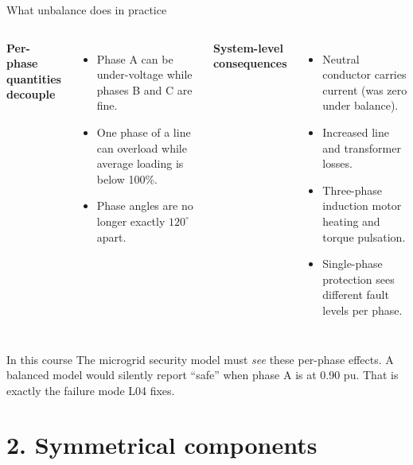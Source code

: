\documentclass[aspectratio=169,10pt]{beamer}
\begin{document}
\begin{frame}{What unbalance does in practice}
\begin{columns}[T]
\textbf{Per-phase quantities decouple}
\begin{itemize}
  \item Phase A can be under-voltage while phases B and C are fine.
  \item One phase of a line can overload while average loading is below 100\%.
  \item Phase angles are no longer exactly $120^\circ$ apart.
\end{itemize}
\textbf{System-level consequences}
\begin{itemize}
  \item Neutral conductor carries current (was zero under balance).
  \item Increased line and transformer losses.
  \item Three-phase induction motor heating and torque pulsation.
  \item Single-phase protection sees different fault levels per phase.
\end{itemize}
\end{columns}
\vspace{0.6em}
\begin{alertblock}{In this course}
The microgrid security model must \emph{see} these per-phase effects. A balanced model would silently report ``safe'' when phase A is at 0.90 pu. That is exactly the failure mode L04 fixes.
\end{alertblock}
\end{frame}

\section*{2. Symmetrical components}
\end{document}
